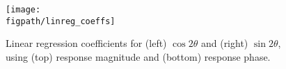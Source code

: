 \begin{figure}[t]
	\centering
		\texttt{[image: \\figpath/linreg\_coeffs]}
	\caption{Linear regression coefficients for (left) $\cos 2\theta$ and (right) $\sin 2\theta$, using (top) response magnitude and (bottom) response phase.}
	\label{f:linreg_coeffs}
\end{figure}